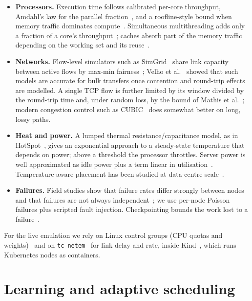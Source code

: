 \documentclass[12pt,a4paper]{report}
\begin{document}
\begin{itemize}
\item \textbf{Processors.} Execution time follows calibrated per-core
      throughput, Amdahl's law for the parallel fraction~\cite{amdahl1967},
      and a roofline-style bound when memory traffic dominates
      compute~\cite{williams2009roofline}. Simultaneous multithreading adds
      only a fraction of a core's throughput~\cite{tullsen1995smt}; caches
      absorb part of the memory traffic depending on the working set and
      its reuse~\cite{hennessy2017ca}.
\item \textbf{Networks.} Flow-level simulators such as
      SimGrid~\cite{casanova2014simgrid} share link capacity between active
      flows by max-min fairness~\cite{bertsekas1992data}; Velho et
      al.~\cite{velho2013flow} showed that such models are accurate for
      bulk transfers once contention and round-trip effects are modelled.
      A single TCP flow is further limited by its window divided by the
      round-trip time and, under random loss, by the bound of Mathis et
      al.~\cite{mathis1997tcp}; modern congestion control such as
      CUBIC~\cite{ha2008cubic} does somewhat better on long, lossy paths.
\item \textbf{Heat and power.} A lumped thermal resistance/capacitance
      model, as in HotSpot~\cite{skadron2003temperature}, gives an
      exponential approach to a steady-state temperature that depends on
      power; above a threshold the processor throttles. Server power is
      well approximated as idle power plus a term linear in
      utilisation~\cite{fan2007power}. Temperature-aware placement has been
      studied at data-centre scale~\cite{moore2005cool}.
\item \textbf{Failures.} Field studies show that failure rates differ
      strongly between nodes and that failures are not always
      independent~\cite{schroeder2010failures}; we use per-node Poisson
      failures plus scripted fault injection. Checkpointing bounds the work
      lost to a failure~\cite{young1974checkpoint}.
\end{itemize}

For the live emulation we rely on Linux control groups (CPU quotas and
weights)~\cite{cgroup-v2} and on \texttt{tc netem}~\cite{hemminger2005netem}
for link delay and rate, inside Kind~\cite{kind-quickstart}, which runs
Kubernetes nodes as containers.

\section{Learning and adaptive scheduling}
\end{document}
